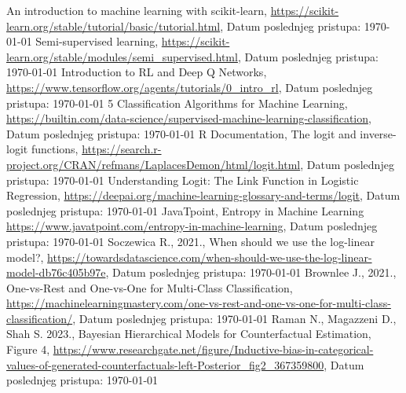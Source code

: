 \documentclass[fontsize=12bp, paper=a4]{scrarticle}
\begin{document}


\newpage

\begin{thebibliography}{1}
  An introduction to machine learning with scikit-learn, \url{https://scikit-learn.org/stable/tutorial/basic/tutorial.html}, Datum poslednjeg pristupa: \today
  Semi-supervised learning, \url{https://scikit-learn.org/stable/modules/semi_supervised.html}, Datum poslednjeg pristupa: \today
  Introduction to RL and Deep Q Networks, \url{https://www.tensorflow.org/agents/tutorials/0_intro_rl}, Datum poslednjeg pristupa: \today
  5 Classification Algorithms for Machine Learning, \url{https://builtin.com/data-science/supervised-machine-learning-classification}, Datum poslednjeg pristupa: \today
    R Documentation, The logit and inverse-logit functions, \url{https://search.r-project.org/CRAN/refmans/LaplacesDemon/html/logit.html}, Datum poslednjeg pristupa: \today
    Understanding Logit: The Link Function in Logistic Regression, \url{https://deepai.org/machine-learning-glossary-and-terms/logit}, Datum poslednjeg pristupa: \today
    JavaTpoint, Entropy in Machine Learning \url{https://www.javatpoint.com/entropy-in-machine-learning}, Datum poslednjeg pristupa: \today
    Soczewica R., 2021., When should we use the log-linear model?, \url{https://towardsdatascience.com/when-should-we-use-the-log-linear-model-db76c405b97e}, Datum poslednjeg pristupa: \today
    Brownlee J., 2021., One-vs-Rest and One-vs-One for Multi-Class Classification, \url{https://machinelearningmastery.com/one-vs-rest-and-one-vs-one-for-multi-class-classification/}, Datum poslednjeg pristupa: \today
    Raman N., Magazzeni D., Shah S. 2023., Bayesian Hierarchical Models for Counterfactual Estimation, Figure 4, \url{https://www.researchgate.net/figure/Inductive-bias-in-categorical-values-of-generated-counterfactuals-left-Posterior_fig2_367359800}, Datum poslednjeg pristupa: \today

\end{thebibliography}
\end{document}
